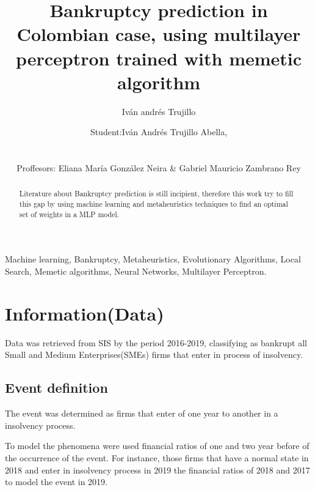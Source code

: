 \documentclass[journal]{IEEEtai}
\begin{document}
\title{Bankruptcy prediction in Colombian case, using multilayer perceptron trained with memetic algorithm} 


\author{ Iván andrés Trujillo }

\author{Student:Iván Andrés Trujillo Abella,\\

\\
\\

Proffesors: Eliana María González Neira \& Gabriel Mauricio Zambrano Rey}
\maketitle

\begin{abstract}
Literature about Bankruptcy prediction is still incipient, therefore this work try to fill this gap by using machine learning  and metaheuristics techniques to find an optimal set of  weights in a MLP model.
\end{abstract}


\begin{IEEEkeywords}
Machine learning, Bankruptcy, Metaheuristics, Evolutionary Algorithms, Local Search, Memetic algorithms, Neural Networks, Multilayer Perceptron.
\end{IEEEkeywords}





\section{Information(Data)}

Data was retrieved from SIS by the period 2016-2019, classifying as bankrupt all Small and Medium Enterprises(SMEs) firms  that enter in process of insolvency.


\subsection{Event definition}


The event was determined as firms that enter of one year to another in a insolvency process.

To model the phenomena were used  financial ratios of one and two year before of the occurrence of the event. For instance, those firms that have a normal state in 2018 and enter in insolvency process in 2019 the  financial ratios of 2018 and 2017 to model the event in 2019. 
\end{document}
